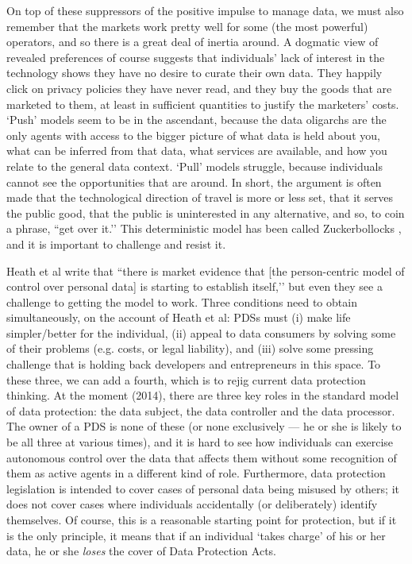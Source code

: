 \documentclass{acm_proc_article-sp}
\begin{document}
On top of these suppressors of the positive impulse to manage data, we must also remember that the markets work pretty well for some (the most powerful) operators, and so there is a great deal of inertia around. A dogmatic view of revealed preferences of course suggests that individuals’ lack of interest in the technology shows they have no desire to curate their own data. They happily click on privacy policies they have never read, and they buy the goods that are marketed to them, at least in sufficient quantities to justify the marketers’ costs. `Push’ models seem to be in the ascendant, because the data oligarchs are the only agents with access to the bigger picture of what data is held about you, what can be inferred from that data, what services are available, and how you relate to the general data context. `Pull’ models struggle, because individuals cannot see the opportunities that are around. In short, the argument is often made that the technological direction of travel is more or less set, that it serves the public good, that the public is uninterested in any alternative, and so, to coin a phrase, ``get over it.’’ This deterministic model has been called Zuckerbollocks \cite{ohara2013}, and it is important to challenge and resist it.


Heath et al write \cite{heath2013} that ``there is market evidence that [the person-centric model of control over personal data] is starting to establish itself,’’ but even they see a challenge to getting the model to work. Three conditions need to obtain simultaneously, on the account of Heath et al: PDSs must (i) make life simpler/better for the individual, (ii) appeal to data consumers by solving some of their problems (e.g. costs, or legal liability), and (iii) solve some pressing challenge that is holding back developers and entrepreneurs in this space. To these three, we can add a fourth, which is to rejig current data protection thinking. At the moment (2014), there are three key roles in the standard model of data protection: the data subject, the data controller and the data processor. The owner of a PDS is none of these (or none exclusively --- he or she is likely to be all three at various times), and it is hard to see how individuals can exercise autonomous control over the data that affects them without some recognition of them as active agents in a different kind of role. Furthermore, data protection legislation is intended to cover cases of personal data being misused by others; it does not cover cases where individuals accidentally (or deliberately) identify themselves. Of course, this is a reasonable starting point for protection, but if it is the only principle, it means that if an individual `takes charge’ of his or her data, he or she {\em loses} the cover of Data Protection Acts.
\end{document}
